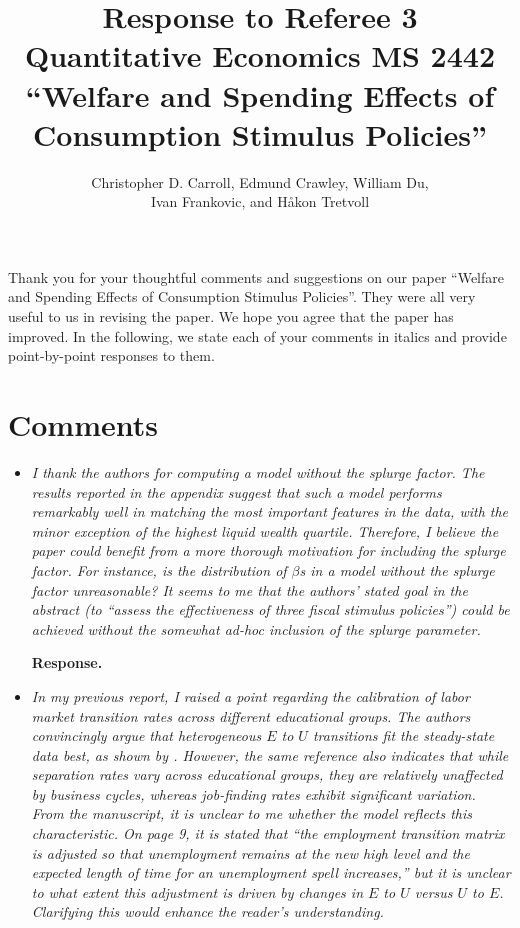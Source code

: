 \documentclass[12pt,letterpaper,english]{article}
\title{\textbf{Response to Referee 3 \\ Quantitative Economics MS 2442 \\``Welfare and Spending Effects of \\ Consumption Stimulus Policies''}}
\author{Christopher D. Carroll, Edmund Crawley, William Du, \\ Ivan Frankovic, and H\aa kon Tretvoll}
\date{}
\begin{document}
	\onehalfspacing
	\maketitle
	
	\noindent Thank you for your thoughtful comments and suggestions on our paper ``Welfare and Spending Effects of Consumption Stimulus Policies''. They were all very useful to us in revising the paper. We hope you agree that the paper has improved. In the following, we state each of your comments in italics and provide point-by-point responses to them.

	
\section{Comments}
\begin{itemize}
	
	\item \textit{I thank the authors for computing a model without the splurge factor. The results reported in the appendix suggest that such a model performs remarkably well in matching the most important features in the data, with the minor exception of the highest liquid wealth quartile. Therefore, I believe the paper could benefit from a more thorough motivation for including the splurge factor. For instance, is the distribution of $\beta$s in a model without the splurge factor unreasonable? It seems to me that the authors’ stated goal in the abstract (to ``assess the effectiveness of three fiscal stimulus policies'') could be achieved without the somewhat ad-hoc inclusion of the splurge parameter.}
	
	\noindent \textbf{Response.} 
	
	\item \textit{In my previous report, I raised a point regarding the calibration of labor market transition rates across different educational groups. The authors convincingly argue that heterogeneous $E$ to $U$ transitions fit the steady-state data best, as shown by \citet{elsby2010labor}. However, the same reference also indicates that while separation rates vary across educational groups, they are relatively unaffected by business cycles, whereas job-finding rates exhibit significant variation. From the manuscript, it is unclear to me whether the model reflects this characteristic. On page 9, it is stated that ``the employment transition matrix is adjusted so that unemployment remains at the new high level and the expected length of time for an unemployment spell increases,'' but it is unclear to what extent this adjustment	is driven by changes in $E$ to $U$ versus $U$ to $E$. Clarifying this would enhance the reader’s understanding.}	
	

\end{itemize}
\end{document}
